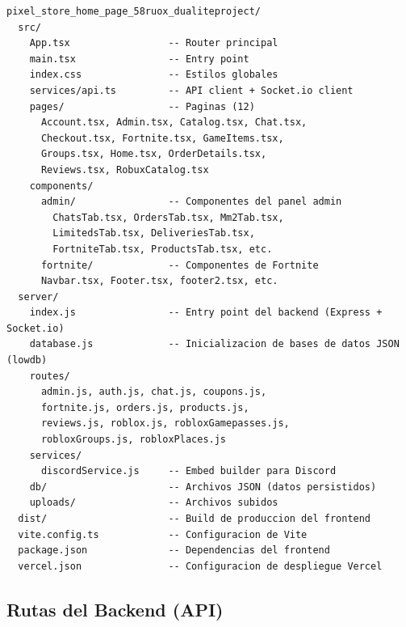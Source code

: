 \documentclass[12pt,a4paper]{article}
\begin{document}
\begin{lstlisting}
pixel_store_home_page_58ruox_dualiteproject/
  src/
    App.tsx                 -- Router principal
    main.tsx                -- Entry point
    index.css               -- Estilos globales
    services/api.ts         -- API client + Socket.io client
    pages/                  -- Paginas (12)
      Account.tsx, Admin.tsx, Catalog.tsx, Chat.tsx,
      Checkout.tsx, Fortnite.tsx, GameItems.tsx,
      Groups.tsx, Home.tsx, OrderDetails.tsx,
      Reviews.tsx, RobuxCatalog.tsx
    components/
      admin/                -- Componentes del panel admin
        ChatsTab.tsx, OrdersTab.tsx, Mm2Tab.tsx,
        LimitedsTab.tsx, DeliveriesTab.tsx,
        FortniteTab.tsx, ProductsTab.tsx, etc.
      fortnite/             -- Componentes de Fortnite
      Navbar.tsx, Footer.tsx, footer2.tsx, etc.
  server/
    index.js                -- Entry point del backend (Express + Socket.io)
    database.js             -- Inicializacion de bases de datos JSON (lowdb)
    routes/
      admin.js, auth.js, chat.js, coupons.js,
      fortnite.js, orders.js, products.js,
      reviews.js, roblox.js, robloxGamepasses.js,
      robloxGroups.js, robloxPlaces.js
    services/
      discordService.js     -- Embed builder para Discord
    db/                     -- Archivos JSON (datos persistidos)
    uploads/                -- Archivos subidos
  dist/                     -- Build de produccion del frontend
  vite.config.ts            -- Configuracion de Vite
  package.json              -- Dependencias del frontend
  vercel.json               -- Configuracion de despliegue Vercel
\end{lstlisting}

\subsection{Rutas del Backend (API)}
\end{document}
